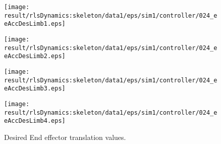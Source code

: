 \begin{figure}[h]
\begin{minipage}{0.24\linewidth}
\centering
\texttt{[image: \\result/rlsDynamics:skeleton/data1/eps/sim1/controller/024\_eeAccDesLimb1.eps]}
\par\footnotesize{}
\end{minipage}
\begin{minipage}{0.24\linewidth}
\centering
\texttt{[image: \\result/rlsDynamics:skeleton/data1/eps/sim1/controller/024\_eeAccDesLimb2.eps]}
\par\footnotesize{}
\end{minipage}
\begin{minipage}{0.24\linewidth}
\centering
\texttt{[image: \\result/rlsDynamics:skeleton/data1/eps/sim1/controller/024\_eeAccDesLimb3.eps]}
\par\footnotesize{}
\end{minipage}
\begin{minipage}{0.24\linewidth}
\centering
\texttt{[image: \\result/rlsDynamics:skeleton/data1/eps/sim1/controller/024\_eeAccDesLimb4.eps]}
\par\footnotesize{}
\end{minipage}

\caption{Desired End effector translation values.}
\end{figure}
